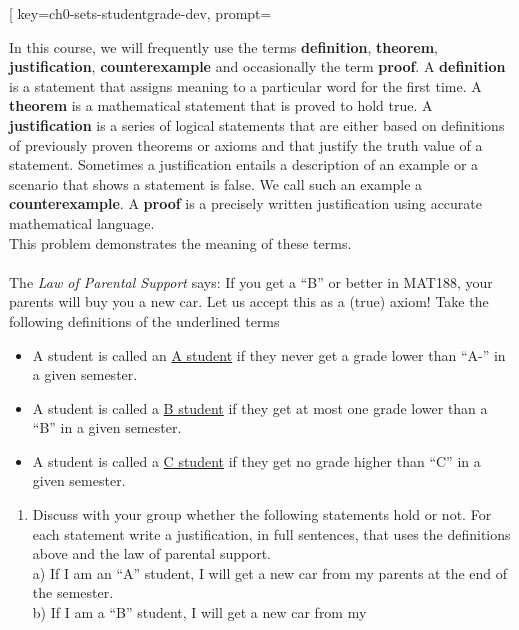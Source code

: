 

\begin{SaveQuestion}[
        key=ch0-sets-studentgrade-dev, 
		prompt={In this course, we will frequently use the terms \textbf{definition}, \textbf{theorem}, \textbf{justification}, \textbf{counterexample} and occasionally the term \textbf{proof}. A \textbf{definition} is a statement that assigns meaning to a particular word for the first time. A \textbf{theorem} is a mathematical statement that is proved to hold true. A \textbf{justification} is a series of logical statements that are either based on definitions of previously proven theorems or axioms and that justify the truth value of a statement. Sometimes a justification entails a description of an example or a scenario that shows a statement is false. We call such an example a \textbf{counterexample}. A \textbf{proof} is a precisely written justification using accurate mathematical language.\\This problem demonstrates the meaning of these terms. \\ \\
	The \emph{Law of Parental Support} says: If you get a ``B'' or better in MAT188, your parents will buy you a new car.  Let us accept this as a (true) axiom! Take the following definitions of the underlined terms
	\begin{itemize}
		\item  A student is called	an \underline{A student}  if they never get a grade lower than ``A-'' in a given semester.
		\item  A student is called	a \underline{B student} if they get at most one grade lower than a ``B'' in a given	semester.
	\item  A student is called a \underline{C student} if they get no grade higher than ``C'' in a given semester.
	\end{itemize}
	\medskip
	\noindent
	\begin{enumerate}
		\item 	Discuss with your group whether the following statements hold or not. For each statement write a justification, in full sentences, that uses the definitions above and the law of parental support. \\
		a) If I am an ``A'' student, I will get a new car from my
		parents at the end of the semester.\\
		b) If I am a ``B'' student, I will get a new car from my

\end{enumerate}}
\end{SaveQuestion}
